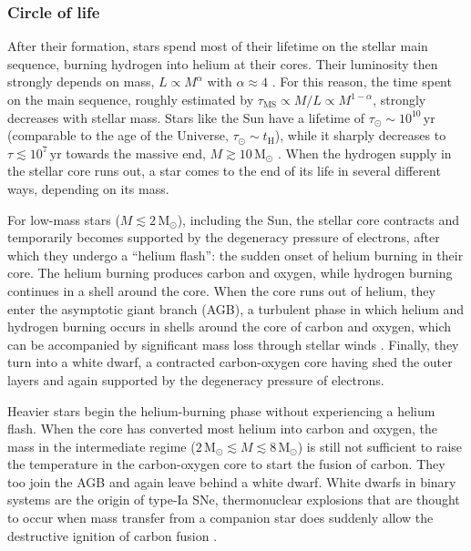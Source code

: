 \subsubsection{Circle of life}
\label{chIsssec:Circle_of_life}

After their formation, stars spend most of their lifetime on the stellar main sequence, burning hydrogen into helium at their cores. Their luminosity then strongly depends on mass, $L \propto M^\alpha$ with $\alpha \approx 4$ \citep[e.g.][]{1993A&AS..100..647B}. For this reason, the time spent on the main sequence, roughly estimated by $\tau_\text{MS} \propto M/L \propto M^{1-\alpha}$, strongly decreases with stellar mass. Stars like the Sun have a lifetime of $\tau_\odot \sim 10^{10} \, \mathrm{yr}$ (comparable to the age of the Universe, $\tau_\odot \sim t_\text{H}$), while it sharply decreases to $\tau \lesssim 10^7 \, \mathrm{yr}$ towards the massive end, $M \gtrsim 10 \, \mathrm{M_\odot}$ \citep{1992A&AS...96..269S}. When the hydrogen supply in the stellar core runs out, a star comes to the end of its life in several different ways, depending on its mass.

For low-mass stars ($M \lesssim 2 \, \mathrm{M_\odot}$), including the Sun, the stellar core contracts and temporarily becomes supported by the degeneracy pressure of electrons, after which they undergo a ``helium flash'': the sudden onset of helium burning in their core. The helium burning produces carbon and oxygen, while hydrogen burning continues in a shell around the core. When the core runs out of helium, they enter the asymptotic giant branch (AGB), a turbulent phase in which helium and hydrogen burning occurs in shells around the core of carbon and oxygen, which can be accompanied by significant mass loss through stellar winds \citep{2010gfe..book.....M}. Finally, they turn into a white dwarf, a contracted carbon-oxygen core having shed the outer layers and again supported by the degeneracy pressure of electrons.

Heavier stars begin the helium-burning phase without experiencing a helium flash. When the core has converted most helium into carbon and oxygen, the mass in the intermediate regime ($2 \, \mathrm{M_\odot} \lesssim M \lesssim 8 \, \mathrm{M_\odot}$) is still not sufficient to raise the temperature in the carbon-oxygen core to start the fusion of carbon. They too join the AGB and again leave behind a white dwarf. White dwarfs in binary systems are the origin of type-Ia SNe, thermonuclear explosions that are thought to occur when mass transfer from a companion star does suddenly allow the destructive ignition of carbon fusion \citep[;  hereafter]{2019A&ARv..27....3M}.

